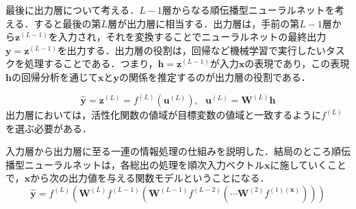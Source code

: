 \documentclass[a4paper,11pt]{jsreport}
\begin{document}
最後に出力層について考える．$L-1$層からなる順伝播型ニューラルネットを考える．すると最後の第$L$層が出力層に相当する．出力層は，手前の第$L-1$層から$\bm{z}^{(L-1)}$を入力され，それを変換することでニューラルネットの最終出力$\bm{y}=\bm{z}^{(L-1)}$を出力する．出力層の役割は，回帰など機械学習で実行したいタスクを処理することである．つまり，$\bm{h}=\bm{z}^{(L-1)}$が入力$\bm{x}$の表現であり，この表現$\bm{h}$の回帰分析を通じて$\bm{x}$と$\bm{y}$の関係を推定するのが出力層の役割である．\par
\begin{equation}
  \hat{\bm{y}}
  = \bm{z}^{(L)}
  = f^{(L)}\left( \bm{u}^{(L)} \right), \ \ \
  \bm{u}^{(L)}
  = \bm{W}^{(L)} \bm{h}
\end{equation}
出力層においては，活性化関数の値域が目標変数の値域と一致するように$f^{(L)}$を選ぶ必要がある．\par
入力層から出力層に至る一連の情報処理の仕組みを説明した．結局のところ順伝播型ニューラルネットは，各総出の処理を順次入力ベクトル$\bm{x}$に施していくことで，$\bm{x}$から次の出力値を与える関数モデルということになる．
\begin{equation}
  \hat{\bm{y}}
  = f^{(L)}\left( \bm{W}^{(L)}f^{(L-1)} \left( \bm{W}^{(L-1)}f^{(L-2)} \left( \cdots \bm{W}^{(2)}f^{(1)(\bm{x})} \right) \right) \right)
\end{equation}
\end{document}
